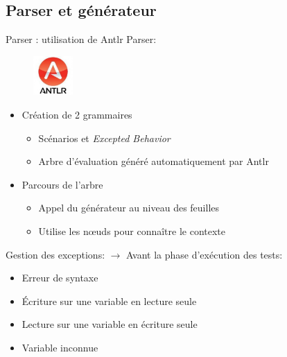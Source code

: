 \documentclass{beamer}
\begin{document}
\subsection{Parser et g\'en\'erateur}
\begin{frame}{Parser : utilisation de Antlr}
	Parser: 
	\vspace{-10px}
\begin{figure}
	\includegraphics[width=1.5cm]{antlr.jpg}
\end{figure}
	\begin{itemize}
		\item Création de 2 grammaires 
			\begin{itemize}
				\item Scénarios et \textit{Excepted Behavior}
				\item Arbre d'évaluation généré automatiquement par Antlr
			\end{itemize}
			\footnotesize
			\normalsize
		\item Parcours de l'arbre
			\begin{itemize}
				\item Appel du générateur au niveau des feuilles
				\item Utilise les n\oe{}uds pour connaître le contexte  
			\end{itemize}
	\end{itemize}
	\vfill
	\pause
	Gestion des exceptions:\newline
	\hspace{20px}
	$\rightarrow$ Avant la phase d'exécution des tests: 
			\begin{itemize}
					\vspace{-10px}
		\item Erreur de syntaxe
		\item Écriture sur une variable en lecture seule
		\item Lecture sur une variable en écriture seule
		\item Variable inconnue 
		\end{itemize}
\end{frame}
\end{document}
